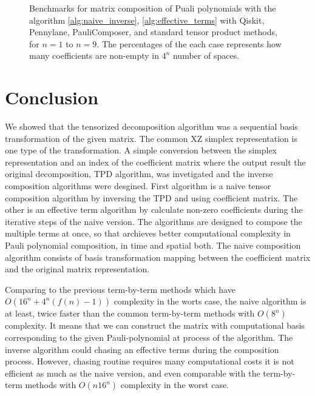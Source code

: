 \documentclass[twocolumn]{article}
\begin{document}
\begin{figure}[ht]
    \caption{Benchmarks for matrix composition of Puali polynomials with the algorithm \ref{alg:naive_inverse}, \ref{alg:effective_terms} with 
    Qiskit, Pennylane, PauliComposer, and standard tensor product methods, for $n=1$ to $n=9$. 
    The percentages of the each case represents how many coefficients are non-empty in $4^n$ number of spaces.}
        \label{fig:results}
\end{figure}

\section{Conclusion}
We showed that the tensorized decomposition algorithm was a 
sequential basis transformation of the given matrix.
The common XZ simplex representation is one type of the transformation.
A simple conversion between the simplex representation and an index of the coefficient matrix 
where the output result the original decomposition, TPD algorithm\cite{hantzko_tensorized_2023}, 
was invetigated and the inverse composition algorithms were desgined. 
First algorithm is a naive tensor composition algorithm by inversing the TPD and using coefficient matrix.
The other is an effective term algorithm by calculate non-zero coefficients during the iterative 
steps of the naive version.
The algorithms are designed to compose the multiple terms at once, 
so that archieves better computational complexity in Pauli polynomial composition, in time and spatial both. 
The naive composition algorithm consists of basis transformation mapping between 
the coefficient matrix and the original matrix representation.

Comparing to the previous term-by-term methods which have $O(16^n + 4^n(f(n)-1))$ complexity in the worts case, 
the naive algorithm is at least, twice faster than the common term-by-term methods  with $O(8^n)$ complexity. 
It means that we can construct the matrix with computational basis corresponding to the given 
Pauli-polynomial at process of the algorithm. 
The inverse algorithm could chasing an effective terms during the composition process. 
However, chasing routine requires many computational costs it is not efficient as much as the naive version,
and even comparable with the term-by-term methods with $O(n16^n)$ complexity in the worst case.
\end{document}
